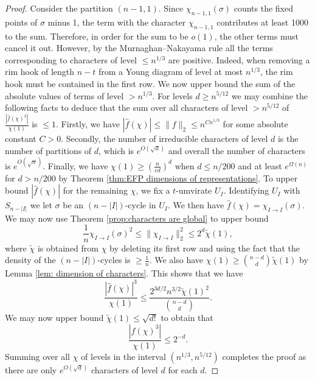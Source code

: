 \documentclass[11pt, letterpaper]{amsart}
\renewcommand\ge{\geqslant}
\renewcommand\le{\leqslant}
\begin{document}
\begin{proof}
Consider the partition $(n-1,1)$. Since $\chi_{n-1,1}(\sigma)$ counts the fixed points of $\sigma$ minus 1, the term with the character $\chi_{n-1,1}$ contributes at least 1000 to the sum. Therefore, in order for the sum to be $o(1)$, the other terms must cancel it out. However, by the Murnaghan--Nakayama rule all the terms corresponding to characters of level $\le n^{1/3}$ are positive. Indeed, when removing a rim hook of length $n-t$ from a Young diagram of level at most $n^{1/3}$, the rim hook must be contained in the first row. We now upper bound the sum of the absolute values of terms of level $>n^{1/3}.$ For levels  $d\ge n^{5/12}$ we may combine the following facts to deduce that the sum over all characters of level $>n^{5/12}$ of $\frac{|\hat{f}(\chi)^3|}{\chi(1)}$ is $\le 1.$  Firstly, we have $|\hat{f}(\chi)|\le \|f\|_2\le n^{Cn^{1/3}}$ for some absolute constant $C>0$. Secondly, the number of irreducible characters of level $d$ is the number of partitions of $d$, which is $e^{O(\sqrt{d})}$ and overall the number of characters is $e^{O(\sqrt{n})}$. Finally, we have $\chi(1)\ge  \left(\frac{n}{ed}\right)^d$ when $d \le n/200$ and at least $e^{\Omega(n)}$ for $d>n/200$ by Theorem \ref{thm:EFP dimensions of representations}. 
To upper bound $|\hat{f}(\chi)|$ for the remaining $\chi$, we fix a $t$-umvirate $U_{I}$. Identifying $U_I$ with $S_{n-|I|}$ we let $\sigma$ be an $(n-|I|)$-cycle in $U_I$. We then have $\hat{f}(\chi) = \chi_{I\to I}(\sigma).$ We may now use Theorem \ref{prop:characters are global} to upper bound \[\frac{1}{n}\chi_{I\to I}(\sigma)^2 \le \|\chi_{I\to I}\|_2^2 \le 2^d \tilde{\chi}(1),\] where $\tilde{\chi}$ is obtained from $\chi$ by deleting its first row and using the fact that the density of the $(n-|I|)$-cycles is $\ge \frac{1}{n}$. We also have $\chi(1)\ge \binom{n-d}{d}\tilde{\chi}(1)$ by Lemma \ref{lem: dimension of characters}.
This shows that we have \[\frac{|\hat{f}(\chi)|^3}{\chi(1)} \le \frac{2^{3d/2}n^{3/2}\tilde{\chi}(1)^2}{\binom{n-d}{d}}.\]
We may now upper bound $\tilde{\chi}(1)\le \sqrt{d!}$ to obtain that
\[
\frac{|\hat{f}(\chi)^3|}{\chi(1)}\le 2^{-d}.
\]
Summing over all $\chi$ of levels in the interval $(n^{1/3}, n^{5/12})$ completes the proof as there are only $e^{O(\sqrt{d})}$ characters of level $d$ for each $d$.
\end{proof}



\end{document}

